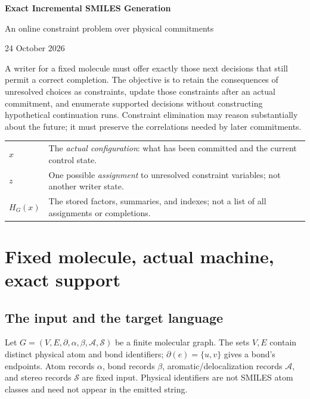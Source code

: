 \documentclass[11pt,a4paper]{article}
\begin{document}
\thispagestyle{plain}
\begin{center}
{\LARGE\bfseries Exact Incremental SMILES Generation\par}
\vspace{5pt}
{\large An online constraint problem over physical commitments\par}
\vspace{8pt}
{\small 24 October 2026\par}
\end{center}
\vspace{3pt}

A writer for a fixed molecule must offer exactly those next decisions that still
permit a correct completion. The objective is to retain the consequences of
unresolved choices as constraints, update those constraints after an actual
commitment, and enumerate supported decisions without constructing hypothetical
continuation runs. Constraint elimination may reason substantially about the
future; it must preserve the correlations needed by later commitments.

\begin{center}
\begin{tabularx}{\linewidth}{@{}lY@{}}
\toprule
\(x\) & The \emph{actual configuration}: what has been committed and the current control state.\\
\(z\) & One possible \emph{assignment} to unresolved constraint variables; not another writer state.\\
\(H_G(x)\) & The stored factors, summaries, and indexes; not a list of all assignments or completions.\\
\bottomrule
\end{tabularx}
\end{center}

\section{Fixed molecule, actual machine, exact support}
\subsection{The input and the target language}
Let \(G=(V,E,\partial,\alpha,\beta,\mathcal A,\mathcal S)\) be a finite molecular
graph. The sets \(V,E\) contain distinct physical atom and bond identifiers;
\(\partial(e)=\{u,v\}\) gives a bond's endpoints. Atom records \(\alpha\), bond
records \(\beta\), aromatic/delocalization records \(\mathcal A\), and stereo
records \(\mathcal S\) are fixed input. Physical identifiers are not SMILES atom
classes and need not appear in the emitted string.
\end{document}
